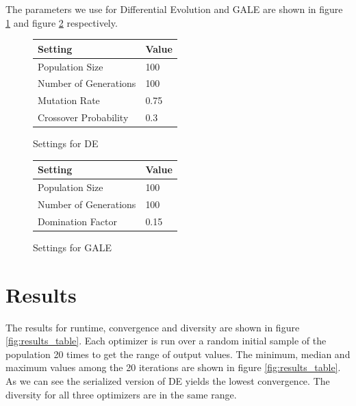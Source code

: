 \documentclass[conference]{IEEEtran}
\begin{document}
The parameters we use for Differential Evolution and GALE are shown in figure \ref{fig:de_settings} and figure \ref{fig:gale_settings} respectively.

\begin{figure}[!t]
\centering
\begin{tabular}{|l@{~}|l@{~}|}
\hline
Setting & Value \\ \hline
Population Size               & 100   \\
Number of Generations         & 100   \\
Mutation Rate                 & 0.75  \\ 
Crossover Probability         & 0.3  \\ \hline
\end{tabular}
\caption{Settings for DE}
\label{fig:de_settings}
\end{figure}

\begin{figure}[!t]
\centering
\begin{tabular}{|l@{~}|l@{~}|}
\hline
Setting & Value \\ \hline
Population Size               & 100   \\
Number of Generations         & 100   \\
Domination Factor             & 0.15  \\ \hline 
\end{tabular}
\caption{Settings for GALE}
\label{fig:gale_settings}
\end{figure}

\section{Results}
The results for runtime, convergence and diversity are shown in figure \ref{fig:results_table}. Each optimizer is run over a random initial sample of the population 20 times to get the range of output values. The minimum, median and maximum values among the 20 iterations are shown in figure \ref{fig:results_table}.  As we can see the serialized version of DE yields the lowest convergence. The diversity for all three optimizers are in the same range.
\end{document}
